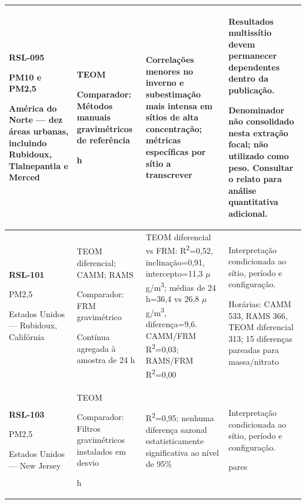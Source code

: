\begin{longtable}{|P{0.18\textwidth}|P{0.25\textwidth}|P{0.28\textwidth}|P{\arrayrulewidth\relax}|}
\textbf{RSL-095}\par\textcite{rsl095}\par PM10 e PM2,5\par América do Norte --- dez áreas urbanas, incluindo Rubidoux, Tlalnepantla e Merced & TEOM\par\medskip Comparador: Métodos manuais gravimétricos de referência\par{} h & Correlações menores no inverno e subestimação mais intensa em sítios de alta concentração; métricas específicas por sítio a transcrever & Resultados multissítio devem permanecer dependentes dentro da publicação.\par\medskip Denominador não consolidado nesta extração focal; não utilizado como peso. Consultar o relato para análise quantitativa adicional.\\\hline
\textbf{RSL-101}\par\textcite{rsl101}\par PM2,5\par Estados Unidos --- Rubidoux, Califórnia & TEOM diferencial; CAMM; RAMS\par\medskip Comparador: FRM gravimétrico\par\medskip Contínua agregada à amostra de 24 h & TEOM diferencial vs FRM: R\textsuperscript{2}=0,52, inclinação=0,91, intercepto=11,3 \ensuremath{\mu}g/m\textsuperscript{3}; médias de 24 h=36,4 vs 26,8 \ensuremath{\mu}g/m\textsuperscript{3}, diferença=9,6. CAMM/FRM R\textsuperscript{2}=0,03; RAMS/FRM R\textsuperscript{2}=0,00 & Interpretação condicionada ao sítio, período e configuração.\par\medskip Horárias: CAMM 533, RAMS 366, TEOM diferencial 313; 15 diferenças pareadas para massa/nitrato\\\hline
\textbf{RSL-103}\par\textcite{rsl103}\par PM2,5\par Estados Unidos --- New Jersey & TEOM\par\medskip Comparador: Filtros gravimétricos instalados em desvio\par{} h & R\textsuperscript{2}=0,95; nenhuma diferença sazonal estatisticamente significativa ao nível de 95\% & Interpretação condicionada ao sítio, período e configuração.\par{} pares\\\hline

\end{longtable}
